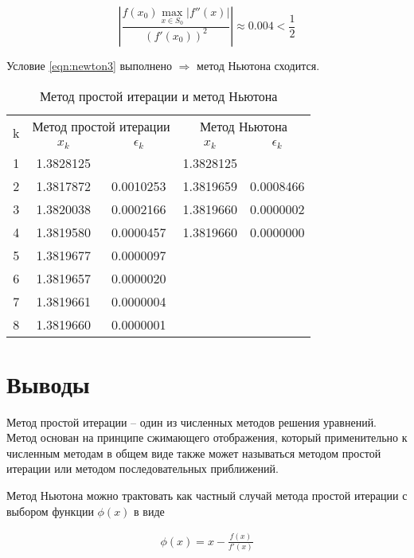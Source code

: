 \documentclass[12pt, a4paper]{article}
\begin{document}
 	\begin{equation}
 		\left|
	 		\frac{f(x_0) \max_{x\in S_0} |f''(x)|}
	 		{(f'(x_0))^2}
 		\right|
 		 \approx 0.004 < \frac{1}{2}
 	\end{equation}
 	
 	Условие \eqref{eqn:newton3} выполнено $\Rightarrow$ метод Ньютона сходится.
 
	 \begin{table}[H]
	 	
	 	\centering
	 	\begin{tabular}{|c|c|c|c|c|}
	 		\hline
	 		\multirow{2}{*}{k} & \multicolumn{2}{c|}{Метод простой итерации} & \multicolumn{2}{c|}{Метод Ньютона} \\ \cline{2-5} 
	 		& $x_k$ &  $\epsilon_k$  & $x_k$ & $\epsilon_k$  \\ \hline
			1       & 1.3828125     & & 1.3828125     & \\ \hline
			2       & 1.3817872     & 0.0010253     & 1.3819659     & 0.0008466 \\ \hline
			3       & 1.3820038     & 0.0002166     & 1.3819660     & 0.0000002 \\ \hline
			4       & 1.3819580     & 0.0000457     & 1.3819660     & 0.0000000 \\ \hline
			5       & 1.3819677     & 0.0000097  &  & \\ \hline
			6       & 1.3819657     & 0.0000020  &  & \\ \hline
			7       & 1.3819661     & 0.0000004  &  & \\ \hline
			8       & 1.3819660     & 0.0000001  &  & \\ \hline

	 		
	 	\end{tabular}
 		\caption{Метод простой итерации и метод Ньютона}
 		\label{table:2}
	 \end{table}
	 
	 \section{Выводы}
	 
	 Метод простой итерации -- один из численных методов решения уравнений. Метод основан на принципе сжимающего отображения, который применительно к численным методам в общем виде также может называться методом простой итерации или методом последовательных приближений.
	 
	 Метод Ньютона можно трактовать как частный случай метода простой итерации с выбором функции $\phi(x)$ в виде
	 
	 \begin{eqnarray}
	 	\phi(x) = x - \frac{f(x)}{f'(x)}
	 \end{eqnarray}
\end{document}
